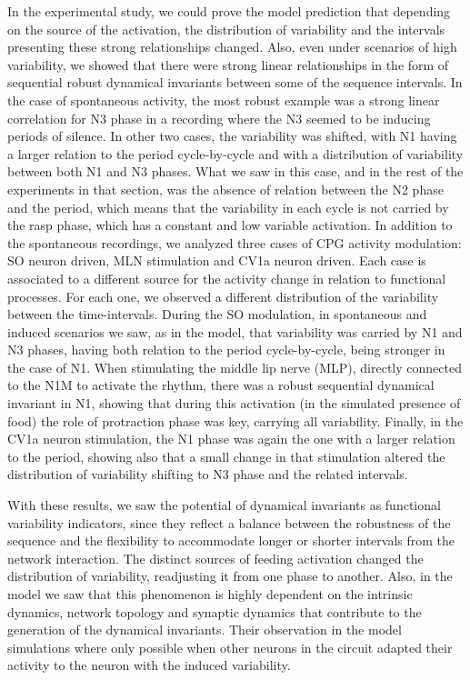 In the experimental study, we could prove the model prediction that depending on the source of the activation, the distribution of variability and the intervals presenting these strong relationships changed. Also, even under scenarios of high variability, we showed that there were strong linear relationships in the form of sequential robust dynamical invariants between some of the sequence intervals. In the case of spontaneous activity, the most robust example was a strong linear correlation for N3 phase in a recording where the N3 seemed to be inducing periods of silence. In other two cases, the variability was shifted, with N1 having a larger relation to the period cycle-by-cycle and with a distribution of variability between both N1 and N3 phases. What we saw in this case, and in the rest of the experiments in that section, was the absence of relation between the N2 phase and the period, which means that the variability in each cycle is not carried by the rasp phase, which has a constant and low variable activation. In addition to the spontaneous recordings, we analyzed three cases of CPG activity modulation: SO neuron driven, MLN stimulation and CV1a neuron driven. Each case is associated to a different source for the activity change in relation to functional processes. For each one, we observed a different distribution of the variability between the time-intervals. During the SO modulation, in spontaneous and induced scenarios we saw, as in the model, that variability was carried by N1 and N3 phases, having both relation to the period cycle-by-cycle, being stronger in the case of N1. When stimulating the middle lip nerve (MLP), directly connected to the N1M to activate the rhythm, there was a robust sequential dynamical invariant in N1, showing that during this activation (in the simulated presence of food) the role of protraction phase was key, carrying all variability. Finally, in the CV1a neuron stimulation, the N1 phase was again the one with a larger relation to the period, showing also that a small change in that stimulation altered the distribution of variability shifting to N3 phase and the related intervals. 

With these results, we saw the potential of dynamical invariants as functional variability indicators, since they reflect a balance between the robustness of the sequence and the flexibility to accommodate longer or shorter intervals from the network interaction. The distinct sources of feeding activation changed the distribution of variability, readjusting it from one phase to another. Also, in the model we saw that this phenomenon is highly dependent on the intrinsic dynamics, network topology and synaptic dynamics that contribute to the generation of the dynamical invariants. Their observation in the model simulations where only possible when other neurons in the circuit adapted their activity to the neuron with the induced variability. 

